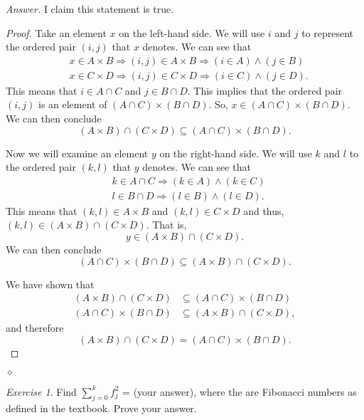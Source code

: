 \documentclass[12pt,oneside]{amsart}
\theoremstyle{remark}
\newtheorem{exer}{Exercise}
\newenvironment{answer}{\bigskip\noindent\emph{Answer.}}{\hfill$\diamond$\newline}
\begin{document}
\begin{answer}
I claim this statement is true.

\begin{proof}
Take an element $x$ on the left-hand side. We will use $i$ and $j$ to represent the ordered pair $(i, j)$ that $x$ denotes. We can see that
\begin{align*}
&x \in A \times B \Rightarrow (i, j) \in A \times B \Rightarrow (i \in A) \wedge (j \in B) \\
&x \in C \times D \Rightarrow (i, j) \in C \times D \Rightarrow (i \in C) \wedge (j \in D).
\end{align*} This means that $i \in A \cap C$ and $j \in B \cap D$. This implies that the ordered pair $(i, j)$ is an element of $(A \cap C) \times (B \cap D).$ So, $x \in (A \cap C) \times (B \cap D)$. We can then conclude \[ (A \times B) \cap (C \times D) \subseteq (A \cap C) \times (B \cap D). \]

Now we will examine an element $y$ on the right-hand side. We will use $k$ and $l$ to the ordered pair $(k, l)$ that $y$ denotes. We can see that
\begin{align*}
&k \in A \cap C \Rightarrow (k \in A) \wedge (k \in C) \\
&l \in B \cap D \Rightarrow (l \in B) \wedge (l \in D).
\end{align*} This means that $(k, l) \in A \times B$ and $(k, l) \in C \times D$ and thus, $(k, l) \in (A \times B) \cap (C \times D)$. That is, \[ y \in (A \times B) \cap (C \times D). \] We can then conclude \[ (A \cap C) \times (B \cap D) \subseteq (A \times B) \cap (C \times D). \]

We have shown that
\begin{align*}
(A \times B) \cap (C \times D) &\subseteq (A \cap C) \times (B \cap D) \\
(A \cap C) \times (B \cap D) &\subseteq (A \times B) \cap (C \times D),
\end{align*} and therefore \[ (A \times B) \cap (C \times D) = (A \cap C) \times (B \cap D). \]
\end{proof}
\end{answer}

%
%
%
%
\newpage
\begin{exer}
Find $\sum_{j = 0}^k f^2_j$ = (your answer), where the are Fibonacci numbers as defined in the textbook. Prove your answer. %
%
%
%
\end{exer}
\end{document}
